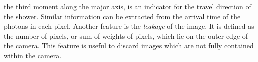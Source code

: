 the third moment along the major axis, is an indicator for the travel direction of the shower. Similar information can be extracted from the arrival time of the photons 
in each pixel. 
Another feature is the \emph{leakage} of the image. It is defined as the number of pixels, or sum of weights of pixels, which lie on the outer edge of the camera.
This feature is useful to discard images which are not fully contained within the camera.



\newcommand{\nvec}{\mathbf{n}}
\newcommand{\hmax}{H_\text{max}}

